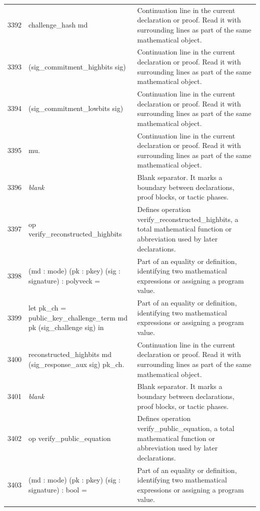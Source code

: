 \documentclass[10pt]{article}
\begin{document}
\begin{longtable}{r L{0.53\textwidth} L{0.37\textwidth}}
3392 & {\ttfamily\scriptsize     challenge\_hash md} & Continuation line in the current declaration or proof.  Read it with surrounding lines as part of the same mathematical object. \\
3393 & {\ttfamily\scriptsize       (sig\_commitment\_highbits sig)} & Continuation line in the current declaration or proof.  Read it with surrounding lines as part of the same mathematical object. \\
3394 & {\ttfamily\scriptsize       (sig\_commitment\_lowbits sig)} & Continuation line in the current declaration or proof.  Read it with surrounding lines as part of the same mathematical object. \\
3395 & {\ttfamily\scriptsize       mu.} & Continuation line in the current declaration or proof.  Read it with surrounding lines as part of the same mathematical object. \\
3396 & {\ttfamily\scriptsize \emph{blank}} & Blank separator.  It marks a boundary between declarations, proof blocks, or tactic phases. \\
3397 & {\ttfamily\scriptsize op verify\_reconstructed\_highbits} & Defines operation verify\_reconstructed\_highbits, a total mathematical function or abbreviation used by later declarations. \\
3398 & {\ttfamily\scriptsize    (md : mode) (pk : pkey) (sig : signature) : polyveck =} & Part of an equality or definition, identifying two mathematical expressions or assigning a program value. \\
3399 & {\ttfamily\scriptsize   let pk\_ch = public\_key\_challenge\_term md pk (sig\_challenge sig) in} & Part of an equality or definition, identifying two mathematical expressions or assigning a program value. \\
3400 & {\ttfamily\scriptsize   reconstructed\_highbits md (sig\_response\_aux sig) pk\_ch.} & Continuation line in the current declaration or proof.  Read it with surrounding lines as part of the same mathematical object. \\
3401 & {\ttfamily\scriptsize \emph{blank}} & Blank separator.  It marks a boundary between declarations, proof blocks, or tactic phases. \\
3402 & {\ttfamily\scriptsize op verify\_public\_equation} & Defines operation verify\_public\_equation, a total mathematical function or abbreviation used by later declarations. \\
3403 & {\ttfamily\scriptsize    (md : mode) (pk : pkey) (sig : signature) : bool =} & Part of an equality or definition, identifying two mathematical expressions or assigning a program value. \\

\end{longtable}
\end{document}
